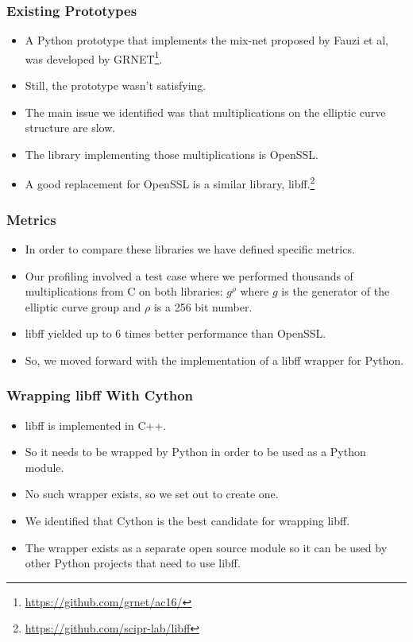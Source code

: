 \documentclass{beamer}
\begin{document}
    \begin{frame}
        \frametitle{Existing Prototypes}
        \begin{itemize}
            \item A Python prototype that implements the mix-net proposed by
            Fauzi et al, was developed by GRNET\footnote{
                \url{https://github.com/grnet/ac16/}
            }.
            \item Still, the prototype wasn't satisfying.
            \item The main issue we identified was that multiplications on the
            elliptic curve structure are slow.
            \item The library implementing those multiplications is OpenSSL.
            \item A good replacement for OpenSSL is a similar library,
            libff.\footnote{\url{https://github.com/scipr-lab/libff}}
        \end{itemize}
    \end{frame}

    \begin{frame}
        \frametitle{Metrics}
        \begin{itemize}
            \item In order to compare these libraries we have defined specific 
            metrics.
            \item Our profiling involved a test case where we performed
            thousands of multiplications from C on both libraries:\newline
            $g ^ \rho$
            where $g$ is the generator of the elliptic curve group and
            $\rho$ is a 256 bit number.
            \item libff yielded up to 6 times better performance than OpenSSL.
            \item So, we moved forward with the implementation of a libff
            wrapper for Python.
        \end{itemize}
    \end{frame}

    \begin{frame}
        \frametitle{Wrapping libff With Cython}
        \begin{itemize}
            \item libff is implemented in C++.
            \item So it needs to be wrapped by Python in order to be used as a
            Python module.
            \item No such wrapper exists, so we set out to create one.
            \item We identified that Cython is the best candidate for wrapping
            libff.
            \item The wrapper exists as a separate open source module
            so it can be used by other Python projects that need to use libff.
        \end{itemize}
    \end{frame}
\end{document}
